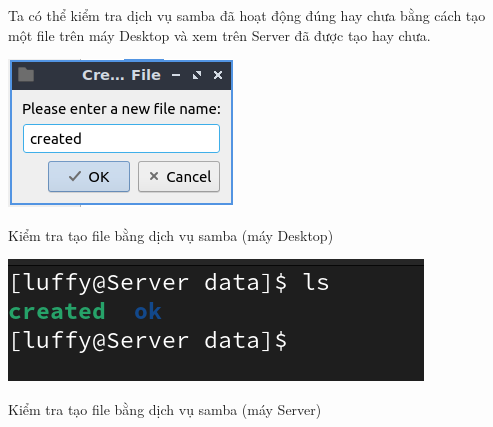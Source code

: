 \documentclass[a4paper, 11pt]{article}
\begin{document}
Ta có thể kiểm tra dịch vụ samba đã hoạt động đúng hay chưa bằng cách tạo một file trên máy Desktop và xem trên Server đã được tạo hay chưa.

\begin{multicols}{2}
    \begin{minipage}
        {\linewidth}
        \captionsetup{type=figure}
        \centering
        \includegraphics[width=\linewidth]{images/samba-created.png}
        \caption{Kiểm tra tạo file bằng dịch vụ samba (máy Desktop)}
        \label{figure:samba-created}
    \end{minipage}

    \begin{minipage}
        {\linewidth}
        \captionsetup{type=figure}
        \centering
        \includegraphics[width=\linewidth]{images/samba-created-server.png}
        \caption{Kiểm tra tạo file bằng dịch vụ samba (máy Server)}
        \label{figure:samba-created-server}
    \end{minipage}
\end{multicols}
\end{document}
